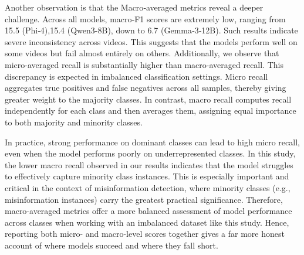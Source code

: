 \documentclass[]{article}
\begin{document}
Another observation is that the Macro‑averaged metrics reveal a deeper
challenge. Across all models, macro‑F1 scores are extremely low, ranging
from 15.5 (Phi‑4),15.4 (Qwen3-8B), down to 6.7 (Gemma‑3‑12B). Such
results indicate severe inconsistency across videos. This suggests that
the models perform well on some videos but fail almost entirely on
others. Additionally, we observe that micro-averaged recall is
substantially higher than macro-averaged recall. This discrepancy is
expected in imbalanced classification settings. Micro recall aggregates
true positives and false negatives across all samples, thereby giving
greater weight to the majority classes. In contrast, macro recall
computes recall independently for each class and then averages them,
assigning equal importance to both majority and minority classes.

In practice, strong performance on dominant classes can lead to high
micro recall, even when the model performs poorly on underrepresented
classes. In this study, the lower macro recall observed in our results indicates that
the model struggles to effectively capture minority class instances.
This is especially important and critical in the context of misinformation
detection, where minority classes (e.g., misinformation instances) carry the greatest practical significance. Therefore, macro-averaged
metrics offer a more balanced assessment of model performance across
classes when working with an imbalanced dataset like this study. Hence, reporting both micro- and macro-level scores together gives 
a far more honest account of where models succeed and where they fall short.
\end{document}
